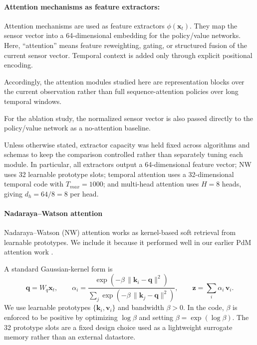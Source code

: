 \documentclass[sn-basic]{sn-jnl}%
\begin{document}
\paragraph{Attention mechanisms as feature extractors:}
\label{sec:attention}

Attention mechanisms are used as feature extractors $\phi(\mathbf{x}_t)$. They map the sensor vector into a 64-dimensional embedding for the policy/value networks. Here, ``attention'' means feature reweighting, gating, or structured fusion of the current sensor vector. Temporal context is added only through explicit positional encoding.

Accordingly, the attention modules studied here are representation blocks over the current observation rather than full sequence-attention policies over long temporal windows.

For the ablation study, the normalized sensor vector is also passed directly to the policy/value network as a no-attention baseline.

Unless otherwise stated, extractor capacity was held fixed across algorithms and schemas to keep the comparison controlled rather than separately tuning each module. In particular, all extractors output a 64-dimensional feature vector; NW uses 32 learnable prototype slots; temporal attention uses a 32-dimensional temporal code with $T_{max}=1000$; and multi-head attention uses $H=8$ heads, giving $d_h=64/8=8$ per head.

\paragraph{Nadaraya--Watson attention}
Nadaraya--Watson (NW) attention works as kernel-based soft retrieval from learnable prototypes. We include it because it performed well in our earlier PdM attention work \cite{Siraskar2024}.

A standard Gaussian-kernel form is
\begin{equation}
        \mathbf{q}=W_q\mathbf{x}_t,\qquad
        \alpha_i = \frac{\exp\left(-\beta\,\lVert \mathbf{k}_i-\mathbf{q}\rVert^2\right)}{\sum_j \exp\left(-\beta\,\lVert \mathbf{k}_j-\mathbf{q}\rVert^2\right)},
        \qquad \mathbf{z}=\sum_i\alpha_i\,\mathbf{v}_i.
\end{equation}
We use learnable prototypes $\{\mathbf{k}_i,\mathbf{v}_i\}$ and bandwidth $\beta>0$. In the code, $\beta$ is enforced to be positive by optimizing $\log \beta$ and setting $\beta=\exp(\log \beta)$. The 32 prototype slots are a fixed design choice used as a lightweight surrogate memory rather than an external datastore.
\end{document}
